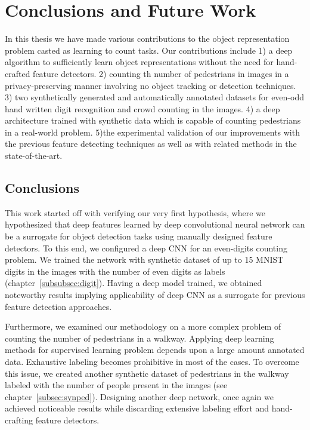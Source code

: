 \newpage

\chapter{Conclusions and Future Work}
\label{sec:conclusions}

\noindent In this thesis we have made various contributions to the object representation problem casted as learning to count tasks. Our contributions include 1) a deep algorithm to sufficiently learn object representations without the need for hand-crafted feature detectors. 2) counting th number of pedestrians in images in a privacy-preserving manner involving no object tracking or detection techniques. 3) two synthetically generated and automatically annotated datasets for even-odd hand written digit recognition and crowd counting in the images. 4) a deep architecture trained with synthetic data which is capable of counting pedestrians in a real-world problem. 5)the experimental validation of our improvements with the previous feature detecting techniques as well as with related methods in the state-of-the-art. 

\section{Conclusions}

This work started off with verifying our very first hypothesis, where we hypothesized that deep features learned by deep convolutional neural network can be a surrogate for object detection tasks using manually designed feature detectors. To this end, we configured a deep CNN for an even-digits counting problem. We trained the network with synthetic dataset of up to 15 MNIST digits in the images with the number of even digits as labels (chapter~\ref{subsubsec:digit}). Having a deep model trained, we obtained noteworthy results implying applicability of deep CNN as a surrogate for previous feature detection approaches.

\indent Furthermore, we examined our methodology on a more complex problem of counting the number of pedestrians in a walkway. Applying deep learning methods for supervised learning problem depends upon a large amount annotated data. Exhaustive labeling becomes prohibitive in most of the cases. To overcome this issue, we created another synthetic dataset of pedestrians in the walkway labeled with the number of people present in the images (see chapter~\ref{subsec:synped}). Designing another deep network, once again we achieved noticeable results while discarding extensive labeling effort and hand-crafting feature detectors.   


